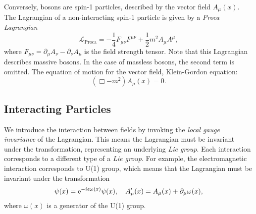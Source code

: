Conversely, bosons are spin-1 particles, described by the vector field $A_\mu(x)$.
The Lagrangian of a non-interacting spin-1 particle is given by a \emph{Proca Lagrangian}
\begin{equation}
    \label{eq:proca_lag}
    \mathcal{L}_{\text{Proca}} = - \frac{1}{4} F_{\mu\nu} F^{\mu\nu} + \frac{1}{2} m^2 A_\mu A^\mu,
\end{equation}
where $F_{\mu\nu} = \partial_\mu A_\nu - \partial_\nu A_\mu$ is the field strength tensor.
Note that this Lagrangian describes massive bosons. 
In the case of massless bosons, the second term is omitted.
The equation of motion for the vector field, Klein-Gordon equation:
\begin{equation}
    \label{eq:klein_gordon}
    \left( \Box - m^2 \right) A_\mu(x) = 0.
\end{equation}

\subsection{Interacting Particles}
\label{sec:interacting_particles}
We introduce the interaction between fields by invoking the \emph{local gauge invariance} of the Lagrangian. 
This means the Lagrangian must be invariant under the transformation, representing an underlying \emph{Lie group}. 
Each interaction corresponds to a different type of a \emph{Lie group}.
For example, the electromagnetic interaction corresponds to U(1) group, which means that the Lagrangian must be invariant under the transformation
\begin{equation}
    \label{eq:gauge_inv_QED}
    \psi(x) = \mathrm{e}^{-i e \omega(x)}\psi(x), \quad A_\mu'(x) = A_\mu(x) + \partial_\mu \omega(x),
\end{equation}
where $\omega(x)$ is a generator of the U(1) group.

